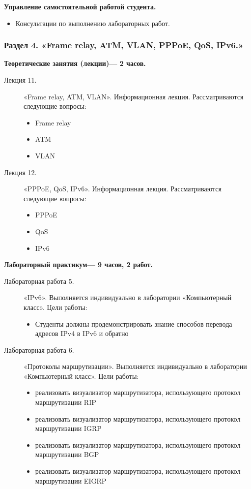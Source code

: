 \begin{center}
{\textbf{Управление самостоятельной работой студента.}
\begin{itemize}
\item Консультации по выполнению лабораторных работ.
\end{itemize}
}


\subsubsection{Раздел 4. «Frame relay, ATM, VLAN, PPPoE, QoS, IPv6.»}

{\parindent0pt

\textbf{Теоретические занятия (лекции)— 2 часов.}
\begin{description}
\item[Лекция 11.] «Frame relay, ATM, VLAN». Информационная лекция. Рассматриваются следующие вопросы: \begin{itemize}
\item Frame relay\item ATM\item VLAN
\end{itemize}\item[Лекция 12.] «PPPoE, QoS, IPv6». Информационная лекция. Рассматриваются следующие вопросы: \begin{itemize}
\item PPPoE\item QoS\item IPv6
\end{itemize}
\end{description}




\textbf{Лабораторный практикум— 9 часов, 2 работ.}
\begin{description}
\item[Лабораторная работа 5.] «IPv6». Выполняется индивидуально в лаборатории «Компьютерный класс». Цели работы: \begin{itemize}
\item Студенты должны продемонстрировать знание способов перевода адресов IPv4 в IPv6 и обратно
\end{itemize}\item[Лабораторная работа 6.] «Протоколы маршрутизации». Выполняется индивидуально в лаборатории «Компьютерный класс». Цели работы: \begin{itemize}
\item реализовать визуализатор маршрутизатора, использующего протокол маршрутизации RIP\item реализовать визуализатор маршрутизатора, использующего протокол маршрутизации IGRP\item реализовать визуализатор маршрутизатора, использующего протокол маршрутизации BGP\item реализовать визуализатор маршрутизатора, использующего протокол маршрутизации EIGRP
\end{itemize}
\end{description}

}
\end{center}
